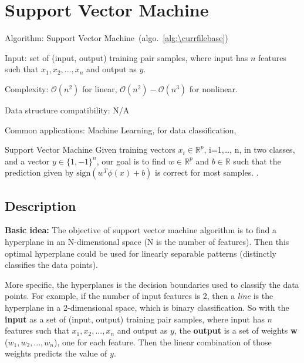 \documentclass[catalog.tex]{subfiles}
\begin{document}
\def\pbname{Support Vector Machine} %

\section{\pbname} 

\begin{overview}
\item [Algorithm:] Support Vector Machine~(algo.~\ref{alg:\currfilebase}) 
\item [Input:] set of (input, output) training pair samples, where input has $n$ features such that $x_1, x_2, ..., x_n$ and output as $y$. 
\item [Complexity:] $\mathcal{O}(n^2)$ for linear, $\mathcal{O}(n^2)-\mathcal{O}(n^3)$ for nonlinear.  
\item [Data structure compatibility:] N/A 
\item [Common applications:] Machine Learning, for data classification, 
\end{overview}


\begin{problem}{\pbname}
Given training vectors \(x_i \in \mathbb{R}^p\), i=1,…, n, in two classes, and a vector \(y \in \{1, -1\}^n\), our goal is to find \(w \in \mathbb{R}^p\) and \(b \in \mathbb{R}\) such that the prediction given by \(\text{sign} (w^T\phi(x) + b)\) is correct for most samples. .
\end{problem}


\subsection*{Description}

\textbf{Basic idea:} The objective of support vector machine algorithm is to find a hyperplane in an N-dimensional space (N is the number of features). Then this optimal hyperplane could be used for linearly separable patterns (distinctly classifies the data points). 

More specific, the hyperplanes is the decision boundaries used to classify the data points. For example, if the number of input features is 2, then a \textit{line} is the hyperplane in a 2-dimensional space, which is binary classification. So with the \textbf{input} as a set of (input, output) training pair samples, where input has $n$ features such that $x_1, x_2, ..., x_n$ and output as $y$, the \textbf{output} is a set of weights \textbf{w} ($w_1, w_2, ..., w_n$), one for each feature. Then the linear combination of those weights predicts the value of $y$. 
\end{document}
